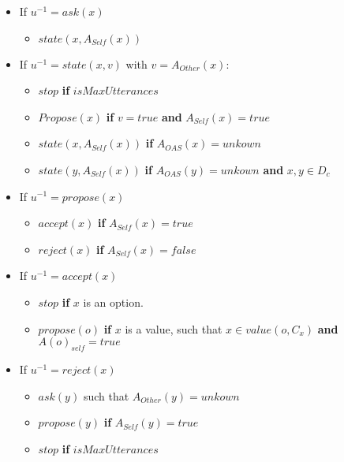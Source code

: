 \documentclass{article}
\begin{document}
\begin{itemize}
	\item If $u ^{-1}=ask (x)$
	\begin{itemize}
		\item $state(x, A_{Self}(x))$
		\\
	\end{itemize}	
	\item If $u ^{-1}=state (x, v)$ with $v = A_{Other}(x) $:
	\begin{itemize}
		\item $stop$ \textbf{if} $isMaxUtterances$
		\item $Propose (x)$ \textbf{ if } $ v = true$ \textbf{ and }
		$ A_{Self}(x) = true$
		\item $state(x,A_{Self}(x))$ \textbf{ if } $A_{OAS}(x)= unkown$
		\item $state(y,A_{Self}(x))$ \textbf{ if } $A_{OAS}(y)= unkown$ \textbf{ and } $x, y \in D_c$
		\\
	\end{itemize}
	
	\item If $u ^{-1}=propose(x)$
	\begin{itemize}
		\item $accept(x)$ \textbf{ if } $A_{Self}(x) = true$
		\item $reject(x)$ \textbf{ if } $A_{Self}(x) = false$
		\\
	\end{itemize}
	
	\item If $u ^{-1}=accept(x)$
	\begin{itemize}
		\item $stop$ \textbf{ if } $x$ is an option.
		\item $propose(o)$ \textbf{ if } $ x$  is a value, such that $x \in value(o, C_x)$ \textbf{ and } $A(o)_{self} = true$
		\\	
	\end{itemize}
	
	\item If $u ^{-1}=reject(x)$
	\begin{itemize}
		\item $ask(y)$ such that $A_{Other}(y)=unkown$
		\item $propose(y)$ \textbf{ if } $A_{Self}(y) = true$
		\item $stop$ \textbf{if} $isMaxUtterances$
		\\	
	\end{itemize}
	
\end{itemize}
\end{document}
